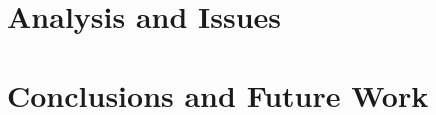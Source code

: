\documentclass[10pt,conference]{IEEEtran}
\begin{document}
\section{Analysis and Issues}
\label{sec:Section_4}
\section{Conclusions and Future Work}
\label{sec:Section_5}

 

\end{document}
